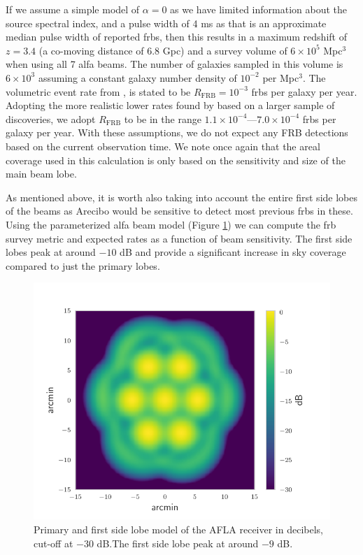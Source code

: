 \documentclass[a4paper,fleqn,usenatbib]{mnras}
\begin{document}
If we assume a simple model of $\alpha=0$ as we have limited information about
the source spectral index, and a pulse width of 4 ms as that is an approximate
median pulse width of reported \glspl{frb}, then this results in a maximum
redshift of $z=3.4$ (a co-moving distance of 6.8 Gpc) and a survey volume of $6
\times 10^5$ Mpc$^3$ when using all 7 \gls{alfa} beams. The number of galaxies
sampled in this volume is $6 \times 10^3$ assuming a constant galaxy number
density of $10^{-2}$ per Mpc$^3$.  The volumetric event rate from
\cite{2013Sci...341...53T}, is stated to be $R_{\textrm{FRB}} = 10^{-3}$
\glspl{frb} per galaxy per year. Adopting the more realistic lower rates found
by \cite{2016MNRAS.460.3370C} based on a larger sample of discoveries, we adopt
$R_{\textrm{FRB}}$ to be in the range $1.1 \times 10^{-4}$---$7.0 \times
10^{-4}$ \glspl{frb} per galaxy per year.  With these assumptions, we do not
expect any FRB detections based on the current observation time. We note once
again that the areal coverage used in this calculation is only based on the
sensitivity and size of the main beam lobe.

As mentioned above, it is worth also taking into account the entire first side
lobes of the beams as Arecibo would be sensitive to detect most previous
\glspl{frb} in these. Using the parameterized \gls{alfa} beam model (Figure
\ref{fig:alfa_beam}) \citep{GALFAbeam} we can compute the \gls{frb} survey
metric and expected rates as a function of beam sensitivity.  The first side
lobes peak at around $-10$ dB and provide a significant increase in sky coverage
compared to just the primary lobes.

\begin{figure}
    \includegraphics[width=1.0\linewidth]{figures/ALFA_beam_1425MHz_dB.pdf}
    \caption{Primary and first side lobe model of the AFLA receiver in
    decibels, cut-off at $-30$ dB.The first side lobe peak at around $-9$ dB.
    }
    \label{fig:alfa_beam}
\end{figure}
\end{document}
